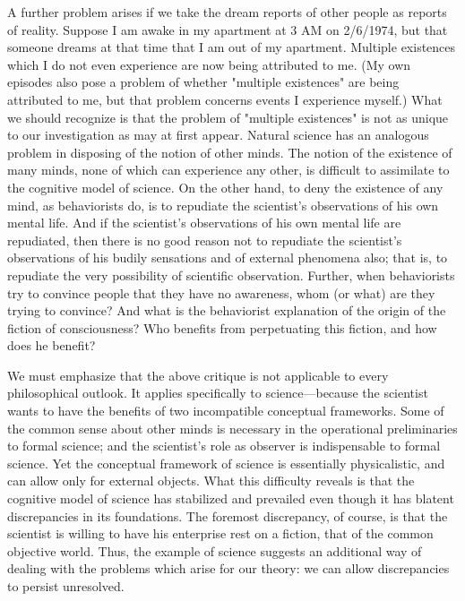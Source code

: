 \documentclass[10pt,twoside,draft]{memoir}
\begin{document}
{{{A further problem arises if we take the dream reports of other people as 
reports of reality. Suppose I am awake in my apartment at 3 AM on 
2/6/1974, but that someone dreams at that time that I am out of my 
apartment. Multiple existences which I do not even experience are now being 
attributed to me. (My own episodes also pose a problem of whether 
"multiple existences" are being attributed to me, but that problem concerns 
events I experience myself.) What we should recognize is that the problem of 
"multiple existences" is not as unique to our investigation as may at first 
appear. Natural science has an analogous problem in disposing of the notion 
of other minds. The notion of the existence of many minds, none of which 
can experience any other, is difficult to assimilate to the cognitive model of 
science. On the other hand, to deny the existence of any mind, as 
behaviorists do, is to repudiate the scientist's observations of his own mental 
life. And if the scientist's observations of his own mental life are repudiated, 
then there is no good reason not to repudiate the scientist's observations of 
his budily sensations and of external phenomena also; that is, to repudiate 
the very possibility of scientific observation. Further, when behaviorists try 
to convince people that they have no awareness, whom (or what) are they 
trying to convince? And what is the behaviorist explanation of the origin of 
the fiction of consciousness? Who benefits from perpetuating this fiction, 
and how does he benefit? 

We must emphasize that the above critique is not applicable to every 
philosophical outlook. It applies specifically to science---because the scientist 
wants to have the benefits of two incompatible conceptual frameworks. 
Some of the common sense about other minds is necessary in the operational 
preliminaries to formal science; and the scientist's role as observer is 
indispensable to formal science. Yet the conceptual framework of science is 
essentially physicalistic, and can allow only for external objects. What this 
difficulty reveals is that the cognitive model of science has stabilized and 
prevailed even though it has blatent discrepancies in its foundations. The 
foremost discrepancy, of course, is that the scientist is willing to have his 
enterprise rest on a fiction, that of the common objective world. Thus, the 
example of science suggests an additional way of dealing with the problems 
which arise for our theory: we can allow discrepancies to persist unresolved. 

}}}
\end{document}
